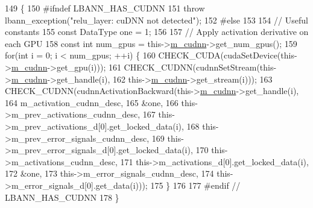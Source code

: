 \begin{DoxyCode}
149                                  \{
150 \textcolor{preprocessor}{  #ifndef LBANN\_HAS\_CUDNN}
151     \textcolor{keywordflow}{throw} lbann\_exception(\textcolor{stringliteral}{"relu\_layer: cuDNN not detected"});
152 \textcolor{preprocessor}{  #else}
153 
154     \textcolor{comment}{// Useful constants}
155     \textcolor{keyword}{const} DataType one = 1;
156 
157     \textcolor{comment}{// Apply activation derivative on each GPU}
158     \textcolor{keyword}{const} \textcolor{keywordtype}{int} num\_gpus = this->\hyperlink{classlbann_1_1Layer_a08dbb94239e3b8c96329786c57c72e21}{m\_cudnn}->get\_num\_gpus();
159     \textcolor{keywordflow}{for}(\textcolor{keywordtype}{int} i = 0; i < num\_gpus; ++i) \{
160       CHECK\_CUDA(cudaSetDevice(this->\hyperlink{classlbann_1_1Layer_a08dbb94239e3b8c96329786c57c72e21}{m\_cudnn}->get\_gpu(i)));
161       CHECK\_CUDNN(cudnnSetStream(this->\hyperlink{classlbann_1_1Layer_a08dbb94239e3b8c96329786c57c72e21}{m\_cudnn}->get\_handle(i),
162                                  this->\hyperlink{classlbann_1_1Layer_a08dbb94239e3b8c96329786c57c72e21}{m\_cudnn}->get\_stream(i)));
163       CHECK\_CUDNN(cudnnActivationBackward(this->\hyperlink{classlbann_1_1Layer_a08dbb94239e3b8c96329786c57c72e21}{m\_cudnn}->get\_handle(i),
164                                           m\_activation\_cudnn\_desc,
165                                           &one,
166                                           this->m\_prev\_activations\_cudnn\_desc,
167                                           this->m\_prev\_activations\_d[0].get\_locked\_data(i),
168                                           this->m\_prev\_error\_signals\_cudnn\_desc,
169                                           this->m\_prev\_error\_signals\_d[0].get\_locked\_data(i),
170                                           this->m\_activations\_cudnn\_desc,
171                                           this->m\_activations\_d[0].get\_locked\_data(i),
172                                           &one,
173                                           this->m\_error\_signals\_cudnn\_desc,
174                                           this->m\_error\_signals\_d[0].get\_data(i)));
175     \}
176 
177 \textcolor{preprocessor}{  #endif // LBANN\_HAS\_CUDNN}
178   \}
\end{DoxyCode}
\mbox{\label{classlbann_1_1relu__layer_af17be85b90887cf3d413fd21e7e20b5c}} 
